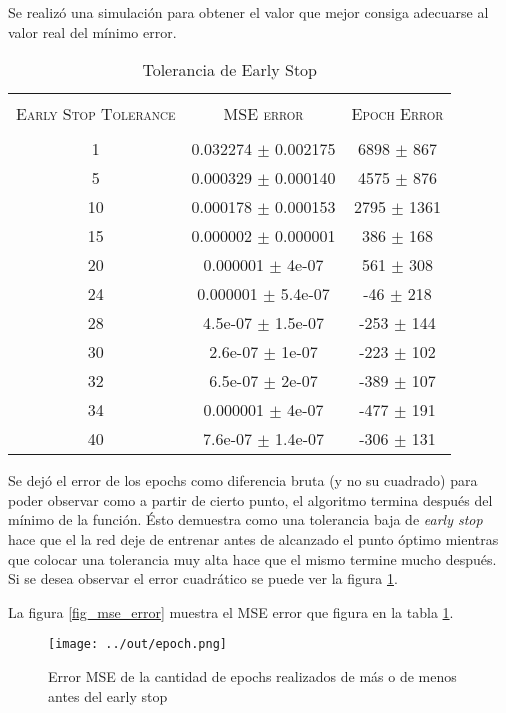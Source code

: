 \documentclass[conference]{IEEEtran}
\theoremstyle{definition}
\begin{document}
Se realiz\'{o} una simulaci\'{o}n para obtener el valor que mejor consiga adecuarse al valor real del m\'{i}nimo error.

\begin{table}[h]
	\centering
	\caption{Tolerancia de Early Stop}
	\label{tab_early_stop_montecarlo}
	\begin{tabular}{ c c c }    
		\hline \\ 
		\textsc{Early Stop Tolerance} & \textsc{MSE error} &  \textsc{Epoch Error}   \\ 
		\hline 
		\\
		1	&  0.032274 \(\pm\) 0.002175 	& 6898 \(\pm\) 867 	\\
		5 	&  0.000329 \(\pm\) 0.000140 	& 4575 \(\pm\) 876 	\\
		10  &  0.000178 \(\pm\) 0.000153 	& 2795 \(\pm\) 1361 \\
		15  &  0.000002 \(\pm\) 0.000001 	& 386  \(\pm\) 168 	\\
		20  &  0.000001 \(\pm\) 4e-07 		& 561  \(\pm\) 308 	\\
		24  &  0.000001 \(\pm\) 5.4e-07 	& -46  \(\pm\) 218 	\\
		28  &  4.5e-07  \(\pm\) 1.5e-07 	& -253  \(\pm\) 144 \\
		30	&  2.6e-07	\(\pm\) 1e-07 		& -223  \(\pm\) 102 \\
		32  &  6.5e-07  \(\pm\) 2e-07 		& -389  \(\pm\) 107 \\
		34  &  0.000001 \(\pm\) 4e-07 		& -477  \(\pm\) 191 \\
		40	&  7.6e-07	\(\pm\) 1.4e-07 	& -306  \(\pm\) 131 \\
		\hline
	\end{tabular}
\end{table}

Se dej\'{o} el error de los epochs como diferencia bruta (y no su cuadrado) para poder observar como a partir de cierto punto, el algoritmo termina despu\'{e}s del m\'{i}nimo de la funci\'{o}n. \'{E}sto demuestra como una tolerancia baja de \textit{early stop} hace que el la red deje de entrenar antes de alcanzado el punto \'{o}ptimo mientras que colocar una tolerancia muy alta hace que el mismo termine mucho despu\'{e}s. Si se desea observar el error cuadr\'{a}tico se puede ver la figura \ref{fig_epoch_error}.

La figura \ref{fig_mse_error} muestra el MSE error que figura en la tabla \ref{tab_early_stop_montecarlo}. 

\begin{figure}[H]
	\centering
	\texttt{[image: ../out/epoch.png]}
	\caption{Error MSE de la cantidad de epochs realizados de m\'{a}s o de menos antes del early stop}
	\label{fig_epoch_error}
\end{figure}
\end{document}
